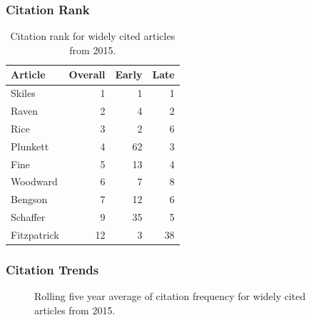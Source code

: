 \documentclass[
  10pt,
  letterpaper,
  DIV=11,
  numbers=noendperiod,
  twoside]{scrartcl}
\begin{document}
\subsubsection*{Citation Rank}\label{sec-rank-2015}

\begin{longtable}[]{@{}lrrr@{}}

\caption{\label{tbl-citation-rank-2015}Citation rank for widely cited
articles from 2015.}

\tabularnewline

\toprule\noalign{}
Article & Overall & Early & Late \\
\midrule\noalign{}
\endhead
\bottomrule\noalign{}
\endlastfoot
Skiles & 1 & 1 & 1 \\
Raven & 2 & 4 & 2 \\
Rice & 3 & 2 & 6 \\
Plunkett & 4 & 62 & 3 \\
Fine & 5 & 13 & 4 \\
Woodward & 6 & 7 & 8 \\
Bengson & 7 & 12 & 6 \\
Schaffer & 9 & 35 & 5 \\
Fitzpatrick & 12 & 3 & 38 \\

\end{longtable}

\subsubsection*{Citation Trends}\label{sec-trends-2015}

\begin{figure}


\caption{\label{fig-citation-spaghetti-2015}Rolling five year average of
citation frequency for widely cited articles from 2015.}

\end{figure}%
\end{document}
